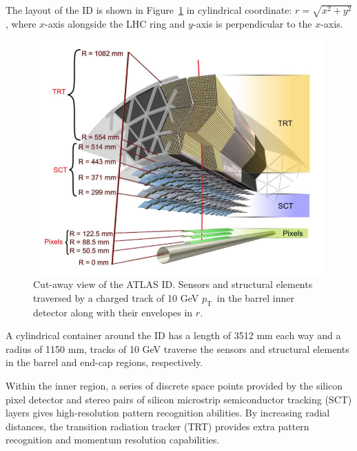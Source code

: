 \documentclass[UTF8,12pt]{ctexart}
\numberwithin{equation}{section}
\newcommand{\pt}{\ensuremath{p_{\mathrm{T}}\xspace}}
\begin{document}
The layout of the ID is shown in Figure~\ref{Fig.id} in cylindrical coordinate: $r=\sqrt{x^2+y^2}$, where $x$-axis alongside the LHC ring and $y$-axis is perpendicular to the $x$-axis.
\begin{figure}[htb] 
	\centering  
	\includegraphics[width=13cm]{./fig/id.png}	\caption{Cut-away view of the ATLAS ID. Sensors and structural elements traversed by a charged track of 10 GeV \pt~in the barrel inner detector along with their envelopes in $r$.}
	\label{Fig.id}
\end{figure}

A cylindrical container around the ID has a length of 3512 mm each way and a radius of 1150 mm, tracks of 10 GeV traverse the sensors and structural elements in the barrel and end-cap regions, respectively.

Within the inner region, a series of discrete space points provided by the silicon pixel detector and stereo pairs of silicon microstrip semiconductor tracking (SCT) layers gives high-resolution pattern recognition abilities. By increasing radial distances, the transition radiation tracker (TRT) provides extra pattern recognition and momentum resolution capabilities.
\end{document}
